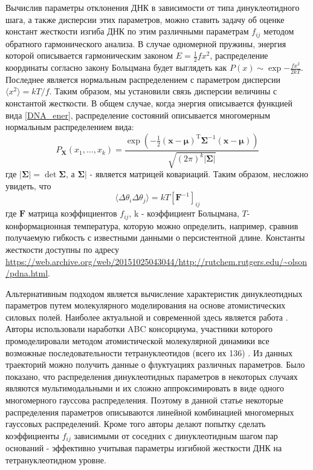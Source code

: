 Вычислив параметры отклонения ДНК в зависимости от типа динуклеотидного шага, а также дисперсии этих параметров, можно ставить задачу об оценке констант жесткости изгиба ДНК по этим различными параметрам $f_{ij}$ методом обратного гармонического анализа. В случае одномерной пружины, энергия которой описывается гармоническим законом $E=\frac{1}{2}fx^2$, распределение координаты согласно закону Больцмана будет выглядеть как $P(x) \sim \exp{-\frac{fx^2}{2kT}}$. Последнее является нормальным распределением с параметром дисперсии $\langle x^2 \rangle=kT/f$. Таким образом, мы установили связь дисперсии величины с константой жесткости.
В общем случае, когда энергия описывается функцией вида \ref{DNA_ener},  распределение состояний описывается многомерным нормальным распределением вида:
\begin{equation}
    P_{\mathbf X}(x_1,\ldots,x_k) = \frac{\exp\left(-\frac 1 2 ({\mathbf x}-{\boldsymbol\mu})^\mathrm{T}{\boldsymbol\Sigma}^{-1}({\mathbf x}-{\boldsymbol\mu})\right)}{\sqrt{(2\pi)^k|\boldsymbol\Sigma|}}
\end{equation}
где $|\boldsymbol\Sigma|=\det \boldsymbol\Sigma$, а $\boldsymbol\Sigma|$ - является матрицей ковариаций. Таким образом, несложно увидеть, что 
\begin{equation}
    \langle   \Delta\theta_{i} \Delta\theta_{j}\rangle=kT[{\boldsymbol F^{-1}}]_{ij}
\end{equation}
где ${\boldsymbol F}$ матрица коэффициентов $f_{ij}$, k - коэффициент Больцмана, $T$- конформационная температура, которую можно определить, например, сравнив получаемую гибкость с известными данными о персистентной длине. Константы жесткости доступны по адресу \url{https://web.archive.org/web/20151025043044/http://rutchem.rutgers.edu/~olson/pdna.html}.


Альтернативным подходом является вычисление характеристик динуклеотидных параметров путем молекулярного моделирования на основе атомистических силовых полей. Наиболее актуальной и современной здесь является работа \cite{walther_multi-modal_2020}. Авторы использовали наработки ABC консорциума, участники которого промоделировали методом атомистической молекулярной динамики все возможные последовательности тетрануклеотидов (всего их 136) \cite{dans_static_2019}. Из данных траекторий можно получить данные о флуктуациях различных параметров. Было показано, что распределения динуклеотидных параметров в некоторых случаях являются мультимодальными и их сложно аппроксимировать в виде одного многомерного гауссова распределения. Поэтому в данной статье некоторые распределения параметров описываются линейной комбинацией многомерных гауссовых распределений. Кроме того авторы делают попытку сделать коэффициенты $f_{ij}$ зависимыми от соседних с динуклеотидным шагом пар оснований - эффективно учитывая параметры изгибной жесткости ДНК на тетрануклеотидном уровне.

